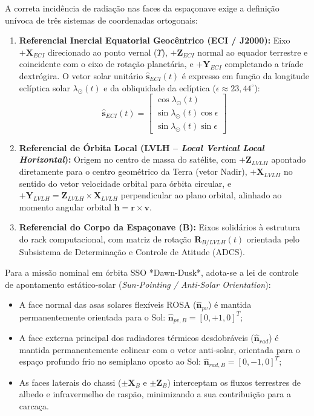 A correta incidência de radiação nas faces da espaçonave exige a definição unívoca de três sistemas de coordenadas ortogonais:
\begin{enumerate}[label=(\alph*)]
    \item \textbf{Referencial Inercial Equatorial Geocêntrico (ECI / J2000):} Eixo $+\mathbf{X}_{ECI}$ direcionado ao ponto vernal ($\Upsilon$), $+\mathbf{Z}_{ECI}$ normal ao equador terrestre e coincidente com o eixo de rotação planetária, e $+\mathbf{Y}_{ECI}$ completando a tríade dextrógira. O vetor solar unitário $\hat{\mathbf{s}}_{ECI}(t)$ é expresso em função da longitude eclíptica solar $\lambda_\odot(t)$ e da obliquidade da eclíptica ($\epsilon \approx 23{,}44^\circ$):
    \begin{equation}
        \hat{\mathbf{s}}_{ECI}(t) = \begin{bmatrix} \cos \lambda_\odot(t) \\ \sin \lambda_\odot(t) \cos \epsilon \\ \sin \lambda_\odot(t) \sin \epsilon \end{bmatrix}
        \label{eq:vetor_solar_eci}
    \end{equation}
    
    \item \textbf{Referencial de Órbita Local (LVLH -- \textit{Local Vertical Local Horizontal}):} Origem no centro de massa do satélite, com $+\mathbf{Z}_{LVLH}$ apontado diretamente para o centro geométrico da Terra (vetor Nadir), $+\mathbf{X}_{LVLH}$ no sentido do vetor velocidade orbital para órbita circular, e $+\mathbf{Y}_{LVLH} = \mathbf{Z}_{LVLH} \times \mathbf{X}_{LVLH}$ perpendicular ao plano orbital, alinhado ao momento angular orbital $\mathbf{h} = \mathbf{r} \times \mathbf{v}$.
    
    \item \textbf{Referencial do Corpo da Espaçonave ($\mathbf{B}$):} Eixos solidários à estrutura do rack computacional, com matriz de rotação $\mathbf{R}_{B/LVLH}(t)$ orientada pelo Subsistema de Determinação e Controle de Atitude (ADCS).
\end{enumerate}

Para a missão nominal em órbita SSO *Dawn-Dusk*, adota-se a lei de controle de apontamento estático-solar (\textit{Sun-Pointing / Anti-Solar Orientation}):
\begin{itemize}[leftmargin=*]
    \item A face normal das asas solares flexíveis ROSA ($\hat{\mathbf{n}}_{pv}$) é mantida permanentemente orientada para o Sol: $\hat{\mathbf{n}}_{pv,B} = [0, +1, 0]^T$;
    \item A face externa principal dos radiadores térmicos desdobráveis ($\hat{\mathbf{n}}_{rad}$) é mantida permanentemente colinear com o vetor anti-solar, orientada para o espaço profundo frio no semiplano oposto ao Sol: $\hat{\mathbf{n}}_{rad,B} = [0, -1, 0]^T$;
    \item As faces laterais do chassi ($\pm \mathbf{X}_B$ e $\pm \mathbf{Z}_B$) interceptam os fluxos terrestres de albedo e infravermelho de raspão, minimizando a sua contribuição para a carcaça.
\end{itemize}

